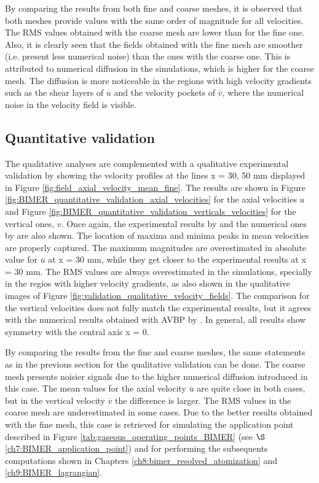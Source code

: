 By comparing the results from both fine and coarse meshes, it is observed that both meshes provide values with the same order of magnitude for all velocities. The RMS values obtained with the coarse mesh are lower than for the fine one. Also, it is clearly seen that the fields obtained with the fine mesh are smoother (i.e. present less numerical noise) than the ones with the coarse one. This is attributed to numerical diffusion in the simulations, which is higher for the coarse mesh. The diffusion is more noticeable in the regions with high velocity gradients such as the shear layers of $\overline{u}$ and the velocity pockets of $\overline{v}$, where the numerical noise in the velocity field is visible. 

\vspace{-0.1in}
\subsection{Quantitative validation}

The qualitative analyses are complemented with a qualitative experimental validation by showing the velocity profiles at the lines x = 30, 50 mm displayed in Figure \ref{fig:field_axial_velocity_mean_fine}.  The results are shown in Figure \ref{fig:BIMER_quantitative_validation_axial_velocities} for the axial velocities $u$ and Figure \ref{fig:BIMER_quantitative_validation_verticals_velocities} for the vertical ones, $v$. Once again, the experimental results by  and the numerical ones by  are also shown. The location of maxima and minima peaks in mean velocities are properly captured. The maximum magnitudes are overestimated in absolute value for $\overline{u}$ at x = 30 mm, while they get closer to the experimental results at x = 30 mm. The RMS values are always overestimated in the simulations, specially in the regios with higher velocity gradients, as also shown in the qualitative images of Figure \ref{fig:validation_qualitative_velocity_fields}. The comparison for the vertical velocities does not fully match the experimental results, but it agrees with the numerical results obtained with AVBP by  . In general, all results show symmetry with the central axis x = 0.

By comparing the results from the fine and coarse meshes, the same statements as in the previous section for the qualitative validation can be done. The coarse mesh presents noisier signals due to the higher numerical diffusion introduced in this case. The mean values for the axial velocity $\overline{u}$ are quite close in both cases, but in the vertical velocity $\overline{v}$ the difference is larger. The RMS values in the coarse mesh are underestimated in some cases. Due to the better results obtained with the fine mesh, this case is retrieved for simulating the application point described in Figure \ref{tab:gaseous_operating_points_BIMER} (see $\S$\ref{ch7:BIMER_application_point}) and for performing the subsequents computations shown in Chapters \ref{ch8:bimer_resolved_atomization} and \ref{ch9:BIMER_lagrangian}.


